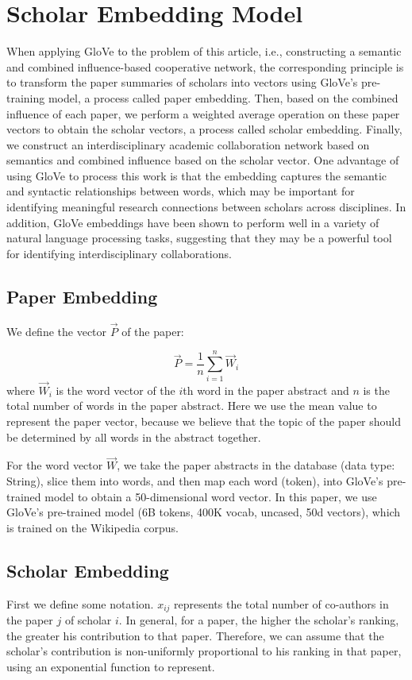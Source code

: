 \documentclass[conference]{IEEEtran}
\begin{document}
\section{Scholar Embedding Model}
When applying GloVe to the problem of this article, i.e., constructing a
semantic and combined influence-based cooperative network, the
corresponding principle is to transform the paper summaries of
scholars into vectors using GloVe's pre-training model, a process called
paper embedding. Then, based on the combined influence of each
paper, we perform a weighted average operation on these paper
vectors to obtain the scholar vectors, a process called scholar
embedding. Finally, we construct an interdisciplinary academic
collaboration network based on semantics and combined influence based on
the scholar vector. One advantage of using GloVe to process this work is
that the embedding captures the semantic and syntactic relationships
between words, which may be important for identifying meaningful
research connections between scholars across disciplines. In addition,
GloVe embeddings have been shown to perform well in a variety of natural
language processing tasks, suggesting that they may be a powerful tool
for identifying interdisciplinary collaborations.

\subsection{Paper Embedding}
We define the vector \(\vec P\) of the paper:

\begin{equation}\label{eq:P}
    \vec P = \frac{1}{n}\sum_{i=1}^{n} \vec W_i
\end{equation}
where \(\vec W_i\) is the word vector of the \(i\)th word in the
paper abstract and \(n\) is the total number of words in the
paper abstract. Here we use the mean value to represent the
paper vector, because we believe that the topic of the paper
should be determined by all words in the abstract together.

For the word vector \(\vec W\), we take the paper abstracts in the
database (data type: String), slice them into words, and then map each
word (token), into GloVe's pre-trained model to obtain a
50-dimensional word vector. In this paper, we use GloVe's
pre-trained model (6B tokens, 400K vocab, uncased, 50d vectors), which
is trained on the Wikipedia corpus.

\subsection{Scholar Embedding}
First we define some notation. \(x_{ij}\) represents the total number of
co-authors in the paper \(j\) of scholar \(i\). In general, for a
paper, the higher the scholar's ranking, the greater his
contribution to that paper. Therefore, we can assume that the
scholar's contribution is non-uniformly proportional to his ranking in
that paper, using an exponential function to represent.
\end{document}
